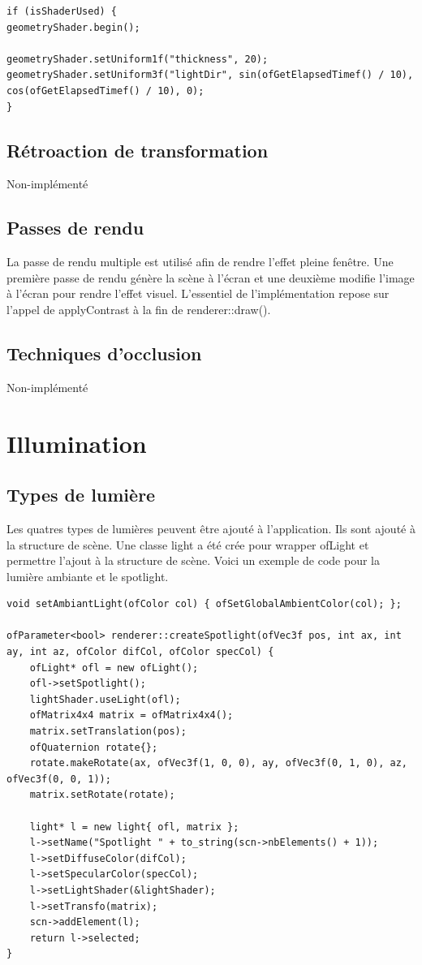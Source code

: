 \begin{lstlisting}
if (isShaderUsed) {
geometryShader.begin();

geometryShader.setUniform1f("thickness", 20);
geometryShader.setUniform3f("lightDir", sin(ofGetElapsedTimef() / 10), cos(ofGetElapsedTimef() / 10), 0);
}
\end{lstlisting}

\subsection{Rétroaction de transformation}
Non-implémenté

\subsection{Passes de rendu}
La passe de rendu multiple est utilisé afin de rendre l'effet pleine fenêtre. Une première passe de rendu génère la scène à l'écran et une deuxième modifie l'image à l'écran pour rendre l'effet visuel. L'essentiel de l'implémentation repose sur l'appel de applyContrast à la fin de renderer::draw().

\subsection{Techniques d'occlusion}
Non-implémenté


\pagebreak
\section{Illumination}
\subsection{Types de lumière}
Les quatres types de lumières peuvent être ajouté à l'application. Ils sont ajouté à la structure de scène. Une classe light a été crée pour wrapper ofLight et permettre l'ajout à la structure de scène. Voici un exemple de code pour la lumière ambiante et le spotlight.

\begin{lstlisting}
void setAmbiantLight(ofColor col) { ofSetGlobalAmbientColor(col); };

ofParameter<bool> renderer::createSpotlight(ofVec3f pos, int ax, int ay, int az, ofColor difCol, ofColor specCol) {
	ofLight* ofl = new ofLight();
	ofl->setSpotlight();
	lightShader.useLight(ofl);
	ofMatrix4x4 matrix = ofMatrix4x4();
	matrix.setTranslation(pos);
	ofQuaternion rotate{};
	rotate.makeRotate(ax, ofVec3f(1, 0, 0), ay, ofVec3f(0, 1, 0), az, ofVec3f(0, 0, 1));
	matrix.setRotate(rotate);
	
	light* l = new light{ ofl, matrix };
	l->setName("Spotlight " + to_string(scn->nbElements() + 1));
	l->setDiffuseColor(difCol);
	l->setSpecularColor(specCol);
	l->setLightShader(&lightShader);
	l->setTransfo(matrix);
	scn->addElement(l);
	return l->selected;
}
\end{lstlisting}

